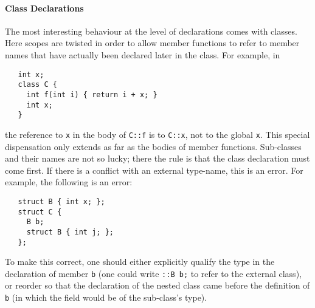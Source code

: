 \documentclass[11pt]{article}
\begin{document}
\paragraph{Class Declarations} The most interesting behaviour at the
level of declarations comes with classes.  Here scopes are twisted in
order to allow member functions to refer to member names that have
actually been declared later in the class.  For example, in
\begin{verbatim}
   int x;
   class C {
     int f(int i) { return i + x; }
     int x;
   }
\end{verbatim}
the reference to \texttt{x} in the body of \texttt{C::f} is to
\texttt{C::x}, not to the global \texttt{x}.  This special
dispensation only extends as far as the bodies of member functions.
Sub-classes and their names are not so lucky; there the rule is that
the class declaration must come first.  If there is a conflict with an
external type-name, this is an error.  For example, the
following is an error:
\begin{verbatim}
   struct B { int x; };
   struct C {
     B b;
     struct B { int j; };
   };
\end{verbatim}
To make this correct, one should either explicitly qualify the type in
the declaration of member \texttt{b} (one could write \texttt{::B~b;}
to refer to the external class), or reorder so that the declaration of
the nested class came before the definition of \texttt{b} (in which
the field would be of the sub-class's type).
\end{document}
